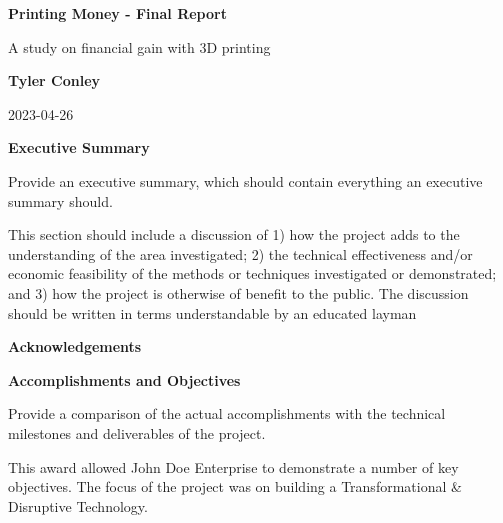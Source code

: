 \documentclass[11pt]{article}
\begin{document}
\begin{titlepage}
    \begin{center}
        \vspace*{1in}

        \Huge
        \textbf{Printing Money - Final Report}

        \vspace{0.25in}
        \LARGE
        A study on financial gain with 3D printing

        \vspace{1 in}

        \textbf{Tyler Conley}

        \vspace{0.5in}
        2023-04-26


        \vfill
    \end{center}
\end{titlepage}


\begin{center}
    \LARGE
    \textbf{Executive Summary}
\end{center}

Provide an executive summary, which should contain everything an executive summary should.

This section should include a discussion of 1) how the project adds to the understanding of the
area investigated; 2) the technical effectiveness and/or economic feasibility of the methods or
techniques investigated or demonstrated; and 3) how the project is otherwise of benefit to the
public. The discussion should be written in terms understandable by an educated layman

\begin{center}
    \LARGE
    \textbf{Acknowledgements}
\end{center}

\begin{center}
    \LARGE
    \textbf{Accomplishments and Objectives}
\end{center}

Provide a comparison of the actual accomplishments with the technical milestones and deliverables
of the project.

This award allowed John Doe Enterprise to demonstrate a number of key objectives. The focus
of the project was on building a Transformational \& Disruptive Technology.
\end{document}
